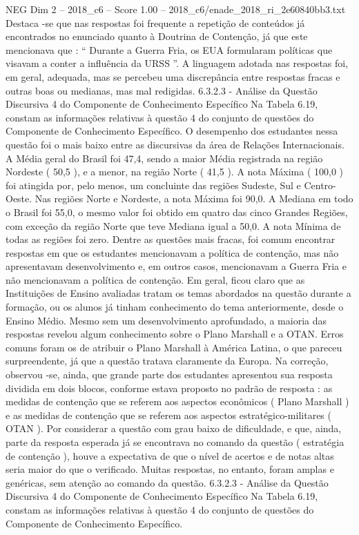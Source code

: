 \begin{textsample}{NEG Dim 2 – 2018\_c6 – Score 1.00 – 2018\_c6/enade\_2018\_ri\_2e60840bb3.txt}
Destaca -se que nas respostas foi frequente a repetição de conteúdos já encontrados no enunciado quanto à Doutrina de Contenção, já que este mencionava que : “ Durante a Guerra Fria, os EUA formularam políticas que visavam a conter a influência da URSS ”.
A linguagem adotada nas respostas foi, em geral, adequada, mas se percebeu uma discrepância entre respostas fracas e outras boas ou medianas, mas mal redigidas. 6.3.2.3 - Análise da Questão Discursiva 4 do Componente de Conhecimento Específico Na Tabela 6.19, constam as informações relativas à questão 4 do conjunto de questões do Componente de Conhecimento Específico.
O desempenho dos estudantes nessa questão foi o mais baixo entre as discursivas da área de Relações Internacionais.
A Média geral do Brasil foi 47,4, sendo a maior Média registrada na região Nordeste ( 50,5 ), e a menor, na região Norte ( 41,5 ).
A nota Máxima ( 100,0 ) foi atingida por, pelo menos, um concluinte das regiões Sudeste, Sul e Centro-Oeste.
Nas regiões Norte e Nordeste, a nota Máxima foi 90,0.
A Mediana em todo o Brasil foi 55,0, o mesmo valor foi obtido em quatro das cinco Grandes Regiões, com exceção da região Norte que teve Mediana igual a 50,0.
A nota Mínima de todas as regiões foi zero.
Dentre as questões mais fracas, foi comum encontrar respostas em que os estudantes mencionavam a política de contenção, mas não apresentavam desenvolvimento e, em outros casos, mencionavam a Guerra Fria e não mencionavam a política de contenção.
Em geral, ficou claro que as Instituições de Ensino avaliadas tratam os temas abordados na questão durante a formação, ou os alunos já tinham conhecimento do tema anteriormente, desde o Ensino Médio.
Mesmo sem um desenvolvimento aprofundado, a maioria das respostas revelou algum conhecimento sobre o Plano Marshall e a OTAN.
Erros comuns foram os de atribuir o Plano Marshall à América Latina, o que pareceu surpreendente, já que a questão tratava claramente da Europa.
Na correção, observou -se, ainda, que grande parte dos estudantes apresentou sua resposta dividida em dois blocos, conforme estava proposto no padrão de resposta : as medidas de contenção que se referem aos aspectos econômicos ( Plano Marshall ) e as medidas de contenção que se referem aos aspectos estratégico-militares ( OTAN ).
Por considerar a questão com grau baixo de dificuldade, e que, ainda, parte da resposta esperada já se encontrava no comando da questão ( estratégia de contenção ), houve a expectativa de que o nível de acertos e de notas altas seria maior do que o verificado.
Muitas respostas, no entanto, foram amplas e genéricas, sem atenção ao comando da questão. 6.3.2.3 - Análise da Questão Discursiva 4 do Componente de Conhecimento Específico Na Tabela 6.19, constam as informações relativas à questão 4 do conjunto de questões do Componente de Conhecimento Específico.

\end{textsample}
